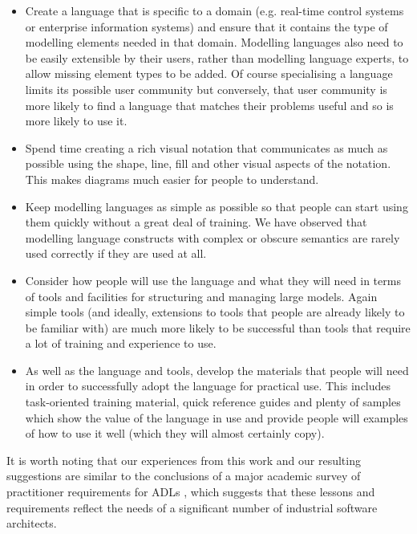 \begin{itemize}
\item Create a language that is specific to a domain (e.g. real-time control systems or enterprise information systems) and ensure that it contains the type of modelling elements needed in that domain.  Modelling languages also need to be easily extensible by their users, rather than modelling language experts, to allow missing element types to be added.  Of course specialising a language limits its possible user community but conversely, that user community is more likely to find a language that matches their problems useful and so is more likely to use it.

\item Spend time creating a rich visual notation that communicates as much as possible using the shape, line, fill and other visual aspects of the notation.  This makes diagrams much easier for people to understand.

\item Keep modelling languages as simple as possible so that people can start using them quickly without a great deal of training.  We have observed that modelling language constructs with complex or obscure semantics are rarely used correctly if they are used at all.

\item Consider how people will use the language and what they will need in terms of tools and facilities for structuring and managing large models.  Again simple tools (and ideally, extensions to tools that people are already likely to be familiar with) are much more likely to be successful than tools that require a lot of training and experience to use.

\item As well as the language and tools, develop the materials that people will need in order to successfully adopt the language for practical use.  This includes task-oriented training material, quick reference guides and plenty of samples which show the value of the language in use and provide people will examples of how to use it well (which they will almost certainly copy).
\end{itemize}

  It is worth noting that our experiences from this work and our resulting suggestions are similar to the conclusions of a major academic survey of practitioner requirements for 
  ADLs \cite{malavolta2013-industryadlneeds}, which suggests that these lessons and requirements reflect the needs of a significant number of industrial software architects.


